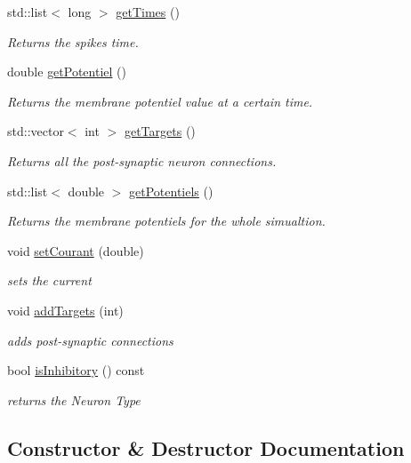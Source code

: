 \begin{DoxyCompactItemize}
std\+::list$<$ long $>$ \hyperlink{classneurone_a36c9b4a43331890178cf8ef774cf53f7}{get\+Times} ()
\begin{DoxyCompactList}\small\item\em Returns the spikes time. \end{DoxyCompactList}\item 
double \hyperlink{classneurone_a938d3de8c8ae1c340e72e4a95c54299b}{get\+Potentiel} ()
\begin{DoxyCompactList}\small\item\em Returns the membrane potentiel value at a certain time. \end{DoxyCompactList}\item 
std\+::vector$<$ int $>$ \hyperlink{classneurone_a9570ddccdc114d63de75d2c454fbcb52}{get\+Targets} ()
\begin{DoxyCompactList}\small\item\em Returns all the post-\/synaptic neuron connections. \end{DoxyCompactList}\item 
std\+::list$<$ double $>$ \hyperlink{classneurone_a2dc85a6664fb7c1ada0283c23460fe1f}{get\+Potentiels} ()
\begin{DoxyCompactList}\small\item\em Returns the membrane potentiels for the whole simualtion. \end{DoxyCompactList}\item 
void \hyperlink{classneurone_aee16c91befdb31b71067f7e800053d46}{set\+Courant} (double)
\begin{DoxyCompactList}\small\item\em sets the current \end{DoxyCompactList}\item 
void \hyperlink{classneurone_a8c25852b6c75970227a57b51665dd5b8}{add\+Targets} (int)
\begin{DoxyCompactList}\small\item\em add\textquotesingle{}s post-\/synaptic connections \end{DoxyCompactList}\item 
bool \hyperlink{classneurone_ae3f754b75dc3f92cd9964785d4f6b935}{is\+Inhibitory} () const
\begin{DoxyCompactList}\small\item\em returns the Neuron Type \end{DoxyCompactList}\end{DoxyCompactItemize}


\subsection{Constructor \& Destructor Documentation}
\mbox{\label{classneurone_a45317bb4df99f1e79b5dd3d5ca7fe641}} 
